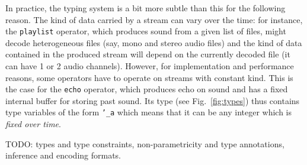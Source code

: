 In practice, the typing system is a bit more subtle than this for the following
reason. The kind of data carried by a stream can vary over the time: for
instance, the \texttt{playlist} operator, which produces sound from a given list
of files, might decode heterogeneous files (say, mono and stereo audio files)
and the kind of data contained in the produced stream will depend on the
currently decoded file (it can have 1 or 2 audio channels). However, for
implementation and performance reasons, some operators have to operate on
streams with constant kind. This is the case for the \texttt{echo} operator,
which produces echo on sound and has a fixed internal buffer for storing past
sound. Its type (see Fig.~\ref{fig:types}) thus contains type variables of the
form \texttt{'\_a} which means that it can be any integer which is \emph{fixed
  over time}.

TODO: types and type constraints, non-parametricity and type annotations,
inference and encoding formats.

